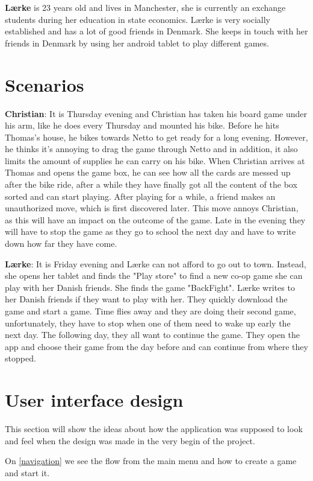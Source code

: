 \textbf{Lærke} is 23 years old and lives in Manchester, she is currently an exchange students during her education in state economics. Lærke is very socially established and has a lot of good friends in Denmark. She keeps in touch with her friends in Denmark by using her android tablet to play different games.

\section{Scenarios}
\textbf{Christian}:
It is Thursday evening and Christian has taken his board game under his arm, like he does every Thursday and mounted his bike. Before he hits Thomas's house, he bikes towards Netto to get ready for a long evening. However, he thinks it's annoying to drag the game through Netto and in addition, it also limits the amount of supplies he can carry on his bike. When Christian arrives at Thomas and opens the game box, he can see how all the cards are messed up after the bike ride, after a while they have finally got all the content of the box sorted and can start playing. After playing for a while, a friend makes an unauthorized move, which is first discovered later. This move annoys Christian, as this will have an impact on the outcome of the game. Late in the evening they will have to stop the game as they go to school the next day and have to write down how far they have come.

\textbf{Lærke}:
It is Friday evening and Lærke can not afford to go out to town. Instead, she opens her tablet and finds the "Play store" to find a new co-op game she can play with her Danish friends. She finds the game "BackFight". Lærke writes to her Danish friends if they want to play with her. They quickly download the game and start a game. Time flies away and they are doing their second game, unfortunately, they have to stop when one of them need to wake up early the next day. The following day, they all want to continue the game. They open the app and choose their game from the day before and can continue from where they stopped.

\section{User interface design}
This section will show the ideas about how the application was supposed to look and feel when the design was made in the very begin of the project.

On \ref{navigation} we see the flow from the main menu and how to create a game and start it.

